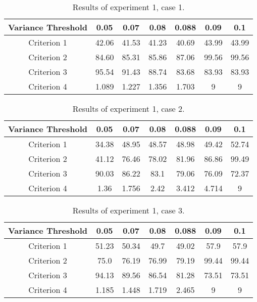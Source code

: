 \documentclass[journal]{IEEEtran}
\begin{document}
%

\begin{table*}[h!]
\begin{center}
    \caption{Results of experiment 1, case 1.}
    \label{tbl:table1}
  \begin{tabular}{c | c c c c c c}
\hline
    Variance Threshold & 0.05 & 0.07 & 0.08 & 0.088 & 0.09 & 0.1 \\ 
 \hline
   Criterion 1 & 42.06 & 41.53 & 41.23 & 40.69 & 43.99 & 43.99 \\%
   Criterion 2 & 84.60 & 85.31 & 85.86 & 87.06 & 99.56 & 99.56 \\ %
   Criterion 3 & 95.54 & 91.43 & 88.74 & 83.68 & 83.93 & 83.93 \\ %
   Criterion 4 & 1.089 & 1.227 & 1.356 & 1.703 & 9 & 9 \\ 
 \hline
   \end{tabular}
\end{center}
\end{table*}

%

\begin{table*}[h!]
\begin{center}
    \caption{Results of experiment 1, case 2.}
    \label{tbl:table2}
  \begin{tabular}{c | c c c c c c}
 \hline
    Variance Threshold & 0.05 & 0.07 & 0.08 & 0.088 & 0.09 & 0.1 \\ 
 \hline
   Criterion 1 & 34.38	& 48.95 &	48.57 & 48.98 & 49.42 & 52.74 \\%
   Criterion 2 & 41.12	& 76.46 & 78.02 & 81.96 & 86.86 & 99.49 \\ %
   Criterion 3 & 90.03	& 86.22 & 83.1	& 79.06 & 76.09 & 72.37 \\ %
   Criterion 4 & 1.36 & 1.756 & 2.42 & 3.412 & 4.714 & 9 \\ 
 \hline
   \end{tabular}
\end{center}
\end{table*}

%

\begin{table*}[h!]
\begin{center}
    \caption{Results of experiment 1, case 3.}
    \label{tbl:table3}
  \begin{tabular}{c | c c c c c c}
\hline
    Variance Threshold & 0.05 & 0.07 & 0.08 & 0.088 & 0.09 & 0.1 \\ 
\hline
   Criterion 1 & 51.23 & 50.34 & 49.7 & 49.02 & 	57.9 & 57.9 \\%
   Criterion 2 & 75.0 & 76.19 & 76.99 & 79.19 & 	99.44 & 99.44 \\ %
   Criterion 3 & 94.13 & 89.56 & 86.54 & 81.28 & 73.51 & 73.51 \\ %
   Criterion 4 & 1.185 &	1.448 & 1.719 & 2.465 & 9 & 9 \\ 
\hline
   \end{tabular}
\end{center}
\end{table*}
\end{document}
